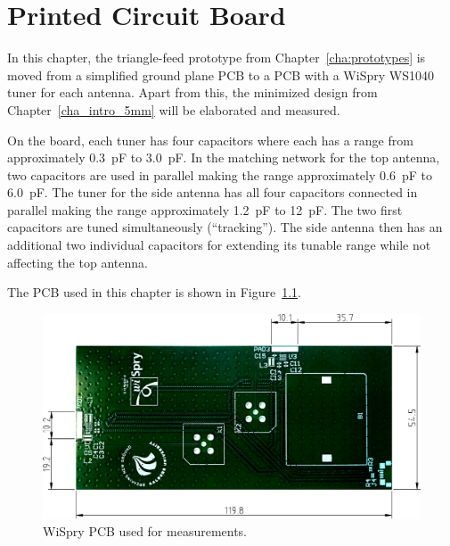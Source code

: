 \chapter{Printed Circuit Board}
\label{cha:pcb}

In this chapter, the triangle-feed prototype from Chapter~\ref{cha:prototypes} is moved from a simplified ground plane PCB to a PCB with a WiSpry WS1040 tuner for each antenna. Apart from this, the minimized design from Chapter~\ref{cha_intro_5mm} will be elaborated and measured.

On the board, each tuner has four capacitors where each has a range from approximately \SI{0.3}{pF} to \SI{3.0}{pF}. In the matching network for the top antenna, two capacitors are used in parallel making the range approximately \SI{0.6}{pF} to \SI{6.0}{pF}. The tuner for the side antenna has all four capacitors connected in parallel making the range approximately \SI{1.2}{pF} to \SI{12}{pF}. The two first capacitors are tuned simultaneously (``tracking''). The side antenna then has an additional two individual capacitors for extending its tunable range while not affecting the top antenna.

The PCB used in this chapter is shown in Figure~\ref{fig:samanthas_board}.

\begin{figure}[htbp]
    \centering
    \includegraphics[scale=0.5]{img/tech_sol/samanthas_board.pdf}
    \caption{WiSpry PCB used for measurements.}
    \label{fig:samanthas_board}
\end{figure}
